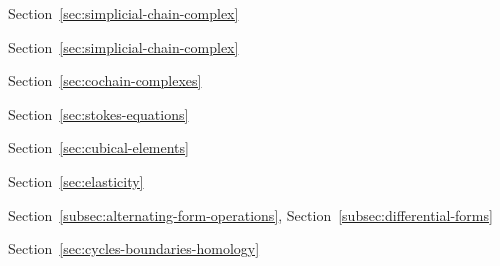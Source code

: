 \par\noindent\hspace*{2em}\label{index:complex-simplicial-pure}\quad Section~\ref{sec:simplicial-chain-complex}

\par\noindent\hspace*{1em}\label{index:complex-simplicial-chain}\quad Section~\ref{sec:simplicial-chain-complex}

\par\noindent\hspace*{1em}\label{index:complex-simplicial-cochain}\quad Section~\ref{sec:cochain-complexes}

\par\noindent\hspace*{1em}\label{index:complex-stokes}\quad Section~\ref{sec:stokes-equations}

\par\noindent\hspace*{1em}\label{index:complex-tensor-product}\quad Section~\ref{sec:cubical-elements}

\par\noindent\hspace*{0em}\label{index:compliance-tensor}\quad Section~\ref{sec:elasticity}

\par\noindent\hspace*{0em}\label{index:contraction}\quad Section~\ref{subsec:alternating-form-operations}, Section~\ref{subsec:differential-forms}

\par\noindent\hspace*{0em}\label{index:cycle}\quad Section~\ref{sec:cycles-boundaries-homology}

